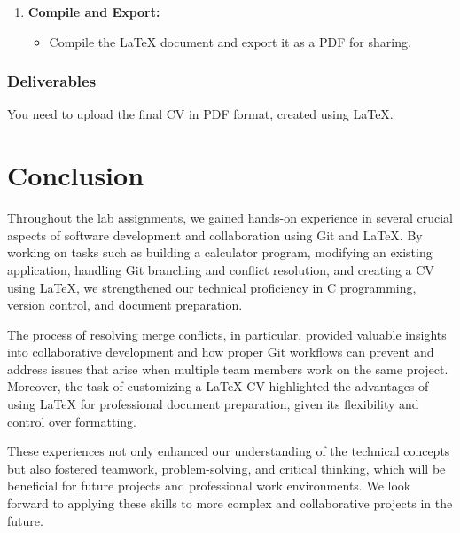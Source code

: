 \documentclass[a4paper,12pt]{article}
\begin{document}
\begin{enumerate}[label=\arabic*.]
    \item \textbf{Compile and Export:}
    \begin{itemize}
        \item Compile the LaTeX document and export it as a PDF for sharing.
    \end{itemize}
\end{enumerate}

\subsubsection*{Deliverables}
You need to upload the final CV in PDF format, created using LaTeX.
\section{Conclusion}

Throughout the lab assignments, we gained hands-on experience in several crucial aspects of software development and collaboration using Git and LaTeX. By working on tasks such as building a calculator program, modifying an existing application, handling Git branching and conflict resolution, and creating a CV using LaTeX, we strengthened our technical proficiency in C programming, version control, and document preparation.

The process of resolving merge conflicts, in particular, provided valuable insights into collaborative development and how proper Git workflows can prevent and address issues that arise when multiple team members work on the same project. Moreover, the task of customizing a LaTeX CV highlighted the advantages of using LaTeX for professional document preparation, given its flexibility and control over formatting.

These experiences not only enhanced our understanding of the technical concepts but also fostered teamwork, problem-solving, and critical thinking, which will be beneficial for future projects and professional work environments. We look forward to applying these skills to more complex and collaborative projects in the future.
\end{document}
